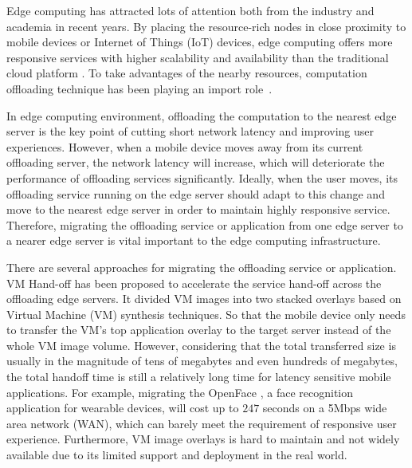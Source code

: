 
Edge computing has attracted lots of attention both from the industry and academia in recent years\cite{satya2009case,  MEC2014initiative, MEC2015-5G, yi2015fog,yi2015survey,shi2016edge,chiang2016fog,satya2017edge}.
By placing the resource-rich nodes in close proximity to mobile devices or Internet of Things (IoT) devices, edge computing offers more responsive services with higher scalability and availability than the traditional cloud platform \cite{MEC2014initiative,satya2017edge}.
To take advantages of the nearby resources, computation offloading technique has been playing an import role~\cite{cuervo2010maui,lane2016deepx,openface2016,liu2016paradrop}.

In edge computing environment, offloading the computation to the nearest edge server is the key point of cutting short network latency and improving user experiences. 
However, when a mobile device moves away from its current offloading server, the network latency will increase, which will deteriorate the performance of offloading services significantly. Ideally, when the user moves, its offloading service running on the edge server should adapt to this change and move to the nearest edge server in order to maintain highly responsive service. 
Therefore, migrating the offloading service or application from one edge server to a nearer edge server is vital important to the edge computing infrastructure. 

There are several approaches for migrating the offloading service or application. 
VM Hand-off \cite{ha2015vmhandoff} has been proposed to accelerate the service hand-off across the offloading edge servers. It divided VM images into two stacked overlays based on Virtual Machine (VM) synthesis \cite{satya2009case} techniques. 
So that the mobile device only needs to transfer the VM's top application overlay to the target server instead of the whole VM image volume. However, considering that the total transferred size is usually in the magnitude of tens of megabytes and even hundreds of megabytes, the total handoff time is still a relatively long time for latency sensitive mobile applications. For example, migrating the OpenFace \cite{openface2016}, a face recognition application for wearable devices, will cost up to $247$ seconds on a 5Mbps wide area network (WAN), which can barely meet the requirement of responsive user experience. 
Furthermore, VM image overlays is hard to maintain and not widely available due to its limited support and deployment in the real world.

